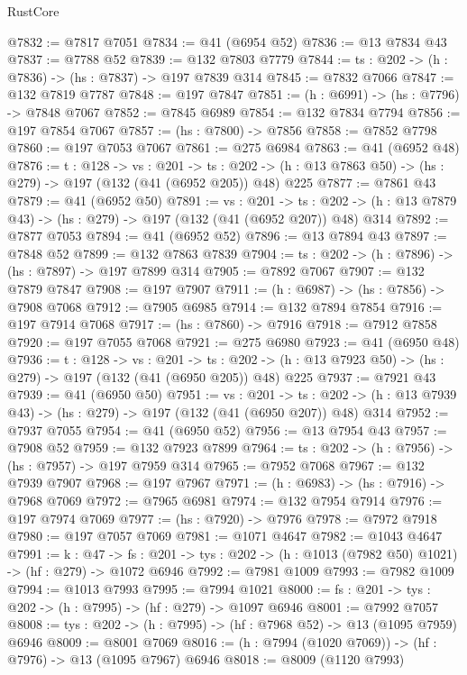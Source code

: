 \begin{lexlean}{RustCore}
\begin{coremodule}
@7832 := @7817 @7051
@7834 := @41 (@6954 @52)
@7836 := @13 @7834 @43
@7837 := @7788 @52
@7839 := @132 @7803 @7779
@7844 := {ts : @202} -> (h : @7836) -> (hs : @7837) -> @197 @7839 @314
@7845 := @7832 @7066
@7847 := @132 @7819 @7787
@7848 := @197 @7847
@7851 := (h : @6991) -> (hs : @7796) -> @7848 @7067
@7852 := @7845 @6989
@7854 := @132 @7834 @7794
@7856 := @197 @7854 @7067
@7857 := (hs : @7800) -> @7856
@7858 := @7852 @7798
@7860 := @197 @7053 @7067
@7861 := @275 @6984
@7863 := @41 (@6952 @48)
@7876 := {t : @128} ->
  {vs : @201} ->
  {ts : @202} -> (h : @13 @7863 @50) -> (hs : @279) -> @197 (@132 (@41 (@6952 @205)) @48) @225
@7877 := @7861 @43
@7879 := @41 (@6952 @50)
@7891 := {vs : @201} ->
  {ts : @202} -> (h : @13 @7879 @43) -> (hs : @279) -> @197 (@132 (@41 (@6952 @207)) @48) @314
@7892 := @7877 @7053
@7894 := @41 (@6952 @52)
@7896 := @13 @7894 @43
@7897 := @7848 @52
@7899 := @132 @7863 @7839
@7904 := {ts : @202} -> (h : @7896) -> (hs : @7897) -> @197 @7899 @314
@7905 := @7892 @7067
@7907 := @132 @7879 @7847
@7908 := @197 @7907
@7911 := (h : @6987) -> (hs : @7856) -> @7908 @7068
@7912 := @7905 @6985
@7914 := @132 @7894 @7854
@7916 := @197 @7914 @7068
@7917 := (hs : @7860) -> @7916
@7918 := @7912 @7858
@7920 := @197 @7055 @7068
@7921 := @275 @6980
@7923 := @41 (@6950 @48)
@7936 := {t : @128} ->
  {vs : @201} ->
  {ts : @202} -> (h : @13 @7923 @50) -> (hs : @279) -> @197 (@132 (@41 (@6950 @205)) @48) @225
@7937 := @7921 @43
@7939 := @41 (@6950 @50)
@7951 := {vs : @201} ->
  {ts : @202} -> (h : @13 @7939 @43) -> (hs : @279) -> @197 (@132 (@41 (@6950 @207)) @48) @314
@7952 := @7937 @7055
@7954 := @41 (@6950 @52)
@7956 := @13 @7954 @43
@7957 := @7908 @52
@7959 := @132 @7923 @7899
@7964 := {ts : @202} -> (h : @7956) -> (hs : @7957) -> @197 @7959 @314
@7965 := @7952 @7068
@7967 := @132 @7939 @7907
@7968 := @197 @7967
@7971 := (h : @6983) -> (hs : @7916) -> @7968 @7069
@7972 := @7965 @6981
@7974 := @132 @7954 @7914
@7976 := @197 @7974 @7069
@7977 := (hs : @7920) -> @7976
@7978 := @7972 @7918
@7980 := @197 @7057 @7069
@7981 := @1071 @4647
@7982 := @1043 @4647
@7991 := {k : @47} ->
  {fs : @201} -> {tys : @202} -> (h : @1013 (@7982 @50) @1021) -> (hf : @279) -> @1072 @6946
@7992 := @7981 @1009
@7993 := @7982 @1009
@7994 := @1013 @7993
@7995 := @7994 @1021
@8000 := {fs : @201} -> {tys : @202} -> (h : @7995) -> (hf : @279) -> @1097 @6946
@8001 := @7992 @7057
@8008 := {tys : @202} -> (h : @7995) -> (hf : @7968 @52) -> @13 (@1095 @7959) @6946
@8009 := @8001 @7069
@8016 := (h : @7994 (@1020 @7069)) -> (hf : @7976) -> @13 (@1095 @7967) @6946
@8018 := @8009 (@1120 @7993)

\end{coremodule}
\end{lexlean}
